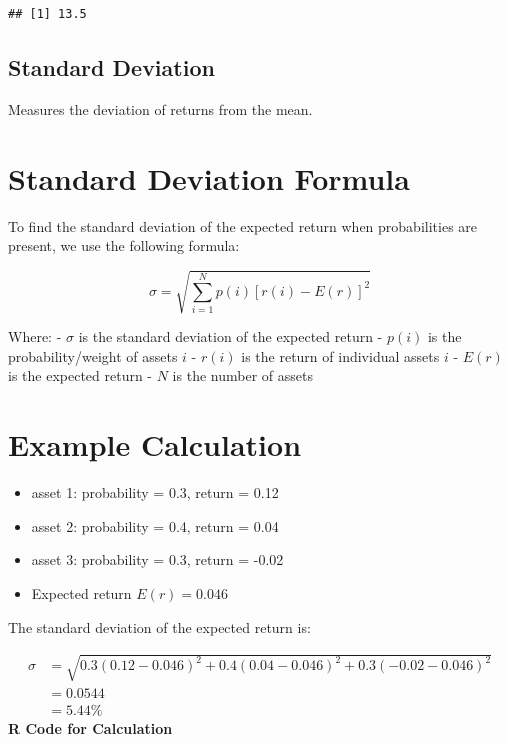\documentclass[
]{book}
\providecommand{\tightlist}{%
  \setlength{\itemsep}{0pt}\setlength{\parskip}{0pt}}
\begin{document}
\begin{verbatim}
## [1] 13.5
\end{verbatim}

\hypertarget{standard-deviation}{%
\subsection{Standard Deviation}\label{standard-deviation}}

Measures the deviation of returns from the mean.

\hypertarget{standard-deviation-formula}{%
\section{Standard Deviation Formula}\label{standard-deviation-formula}}

To find the standard deviation of the expected return when probabilities are present, we use the following formula:

\[
\sigma = \sqrt{\sum_{i=1}^{N} p(i) [r(i) - E(r)]^2}
\]

Where:
- \(\sigma\) is the standard deviation of the expected return
- \(p(i)\) is the probability/weight of assets \(i\)
- \(r(i)\) is the return of individual assets \(i\)
- \(E(r)\) is the expected return
- \(N\) is the number of assets

\hypertarget{example-calculation}{%
\section{Example Calculation}\label{example-calculation}}

\begin{itemize}
\tightlist
\item
  asset 1: probability = 0.3, return = 0.12
\item
  asset 2: probability = 0.4, return = 0.04
\item
  asset 3: probability = 0.3, return = -0.02
\item
  Expected return \(E(r) = 0.046\)
\end{itemize}

The standard deviation of the expected return is:

\[
\begin{aligned}
\sigma &= \sqrt{0.3(0.12 - 0.046)^2 + 0.4(0.04 - 0.046)^2 + 0.3(-0.02 - 0.046)^2}\\
       &= 0.0544\\
       &= 5.44\%
\end{aligned}
\]
\textbf{R Code for Calculation}
\end{document}
